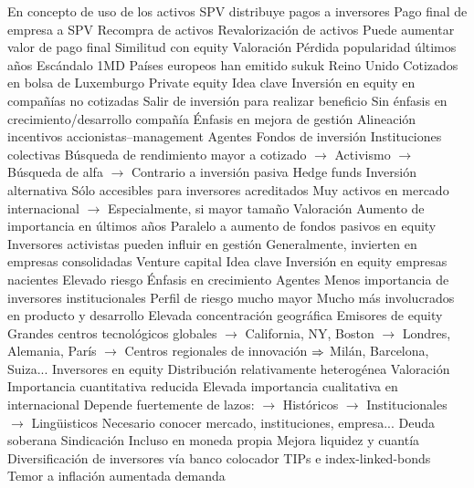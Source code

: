 \documentclass{nuevotema}
\begin{document}
\begin{esquemal}
				\4[] En concepto de uso de los activos
				\4 SPV  distribuye pagos a inversores
				\4 Pago final de empresa a SPV
				\4[] Recompra de activos
				\4 Revalorización de activos
				\4[] Puede aumentar valor de pago final
				\4[$\then$] Similitud con equity
			\3 Valoración
				\4 Pérdida popularidad últimos años
				\4[] Escándalo 1MD
				\4 Países europeos han emitido sukuk
				\4[] Reino Unido
				\4 Cotizados en bolsa de Luxemburgo
		\2 Private equity
			\3 Idea clave
				\4 Inversión en equity en compañías no cotizadas
				\4 Salir de inversión para realizar beneficio
				\4 Sin énfasis en crecimiento/desarrollo compañía
				\4 Énfasis en mejora de gestión
				\4[] Alineación incentivos accionistas--management
			\3 Agentes
				\4 Fondos de inversión
				\4[] Instituciones colectivas
				\4[] Búsqueda de rendimiento mayor a cotizado
				\4[] $\to$ Activismo
				\4[] $\to$ Búsqueda de alfa
				\4[] $\to$ Contrario a inversión pasiva
				\4 Hedge funds
				\4[] Inversión alternativa
				\4[] Sólo accesibles para inversores acreditados
				\4[] Muy activos en mercado internacional
				\4[] $\to$ Especialmente, si mayor tamaño
			\3 Valoración
				\4 Aumento de importancia en últimos años
				\4[] Paralelo a aumento de fondos pasivos en equity
				\4 Inversores activistas pueden influir en gestión
				\4 Generalmente, invierten en empresas consolidadas
		\2 Venture capital
			\3 Idea clave
				\4 Inversión en equity empresas nacientes
				\4 Elevado riesgo
				\4 Énfasis en crecimiento
			\3 Agentes
				\4 Menos importancia de inversores institucionales
				\4 Perfil de riesgo mucho mayor
				\4 Mucho más involucrados en producto y desarrollo
			\3 Elevada concentración geográfica
				\4 Emisores de equity
				\4[] Grandes centros tecnológicos globales
				\4[] $\to$ California, NY, Boston
				\4[] $\to$ Londres, Alemania, París
				\4[] $\to$ Centros regionales de innovación
				\4[] $\then$ Milán, Barcelona, Suiza...
				\4 Inversores en equity
				\4[] Distribución relativamente heterogénea
				\4[]
			\3 Valoración
				\4 Importancia cuantitativa reducida
				\4 Elevada importancia cualitativa en internacional
				\4 Depende fuertemente de lazos:
				\4[] $\to$ Históricos
				\4[] $\to$ Institucionales
				\4[] $\to$ Lingüisticos
				\4[] Necesario conocer mercado, instituciones, empresa...
	\1 
		\2 Deuda soberana
			\3 Sindicación
				\4 Incluso en moneda propia
				\4 Mejora liquidez y cuantía
				\4 Diversificación de inversores vía banco colocador
			\3 TIPs e index-linked-bonds
				\4 Temor a inflación aumentada demanda

\end{esquemal}
\end{document}
